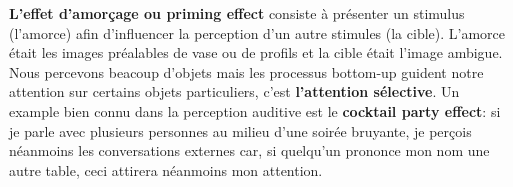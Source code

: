 \begin{figure}[H]
\centering
{}
\end{figure}
	
\textbf{L'effet d'amor\c{c}age ou priming effect} consiste \`a pr\'esenter un stimulus (l'amorce) afin d'influencer la perception d'un autre stimules (la cible). L'amorce \'etait les images pr\'ealables de vase ou de profils et la cible \'etait l'image ambigue. Nous percevons beacoup d'objets mais les processus bottom-up guident notre attention sur certains objets particuliers, c'est \textbf{l'attention s\'elective}. Un example bien connu dans la perception auditive est le \textbf{cocktail party effect}: si je parle avec plusieurs personnes au milieu d'une soir\'ee bruyante, je per\c{c}ois n\'eanmoins les conversations externes car, si quelqu'un prononce mon nom une autre table, ceci attirera n\'eanmoins mon attention.

\begin{figure}[H]
\centering
{}
\end{figure}

